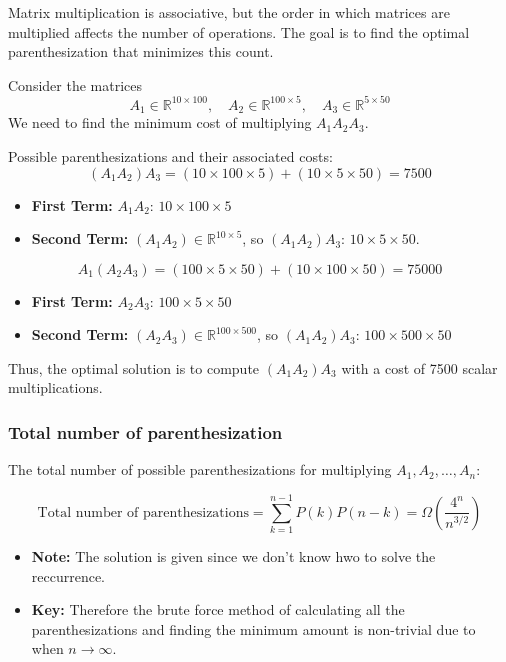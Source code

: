 \begin{intuition}
Matrix multiplication is associative, but the order in which matrices are multiplied affects the number of operations. The goal is to find the optimal parenthesization that minimizes this count.
\end{intuition}

\begin{example}
    Consider the matrices
    \[
    A_1 \in \mathbb{R}^{10 \times 100}, \quad A_2 \in \mathbb{R}^{100 \times 5}, \quad A_3 \in \mathbb{R}^{5 \times 50}
    \]
    We need to find the minimum cost of multiplying \(A_1 A_2 A_3\).
    \vspace{1em}

    Possible parenthesizations and their associated costs:
    \[
    (A_1 A_2) A_3 = (10 \times 100 \times 5) + (10 \times 5 \times 50) = 7500
    \]
    \begin{itemize}
        \item \textbf{First Term:} $A_1 A_2$: $10 \times 100 \times 5$
        \item \textbf{Second Term:} $(A_1 A_2) \in \mathbb{R}^{10 \times 5}$, so $(A_1 A_2) A_3$: $10 \times 5 \times 50$.
    \end{itemize}
    \vspace{1em}

    \[
    A_1 (A_2 A_3) = (100 \times 5 \times 50) + (10 \times 100 \times 50) = 75000
    \]
    \begin{itemize}
        \item \textbf{First Term:} $A_2 A_3$: $ 100 \times 5 \times 50$
        \item \textbf{Second Term:} $(A_2 A_3) \in \mathbb{R}^{100 \times 500}$, so $(A_1 A_2) A_3$: $100 \times 500 \times 50$
    \end{itemize}
    Thus, the optimal solution is to compute \((A_1 A_2) A_3\) with a cost of 7500 scalar multiplications.
\end{example}

\subsubsection{Total number of parenthesization}
\begin{definition}
    The total number of possible parenthesizations for multiplying \(A_1, A_2, \dots, A_n\):

    \begin{equation*}
    \text{Total number of parenthesizations} = \sum_{k=1}^{n-1} P(k)P(n-k) = \Omega \left(\frac{4^n}{n^{3/2}}\right) 
    \end{equation*}
    \begin{itemize}
        \item \textbf{Note:} The solution is given since we don't know hwo to solve the reccurrence. 
        \item \textbf{Key:} Therefore the brute force method of calculating all the parenthesizations and finding the minimum amount is non-trivial due to when $n\rightarrow \infty$.
    \end{itemize}
   
\end{definition}

